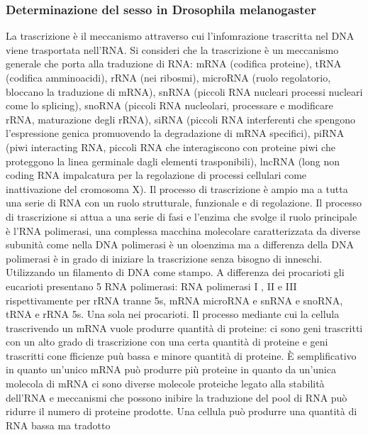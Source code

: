 		\subsubsection{Determinazione del sesso in Drosophila melanogaster}










La trascrizione \`e il meccanismo attraverso cui l'infomrazione trascritta nel DNA viene trasportata nell'RNA. Si consideri che la trascrizione \`e un meccanismo generale che porta
alla traduzione di RNA: mRNA (codifica proteine), tRNA (codifica amminoacidi), rRNA (nei ribosmi), microRNA (ruolo regolatorio, bloccano la traduzione di mRNA), snRNA (piccoli RNA 
nucleari processi nucleari come lo splicing), snoRNA (piccoli RNA nucleolari, processare e modificare rRNA, maturazione degli rRNA), siRNA (piccoli RNA interferenti che spengono 
l'espressione genica promuovendo la degradazione di mRNA specifici), piRNA (piwi interacting RNA, piccoli RNA che interagiscono con proteine piwi che proteggono la linea germinale dagli
elementi trasponibili), lncRNA (long non coding RNA impalcatura per la regolazione di processi cellulari come inattivazione del cromosoma X). Il processo di trascrizione \`e ampio ma a 
tutta una serie di RNA con un ruolo strutturale, funzionale e di regolazione. Il processo di trascrizione si attua a una serie di fasi e l'enzima che svolge il ruolo principale \`e l'RNA
polimerasi, una complessa macchina molecolare caratterizzata da diverse subunit\`a come nella DNA polimerasi \`e un oloenzima ma a differenza della DNA polimerasi \`e in grado di iniziare
la trascrizione senza bisogno di inneschi. Utilizzando un filamento di DNA come stampo. A differenza dei procarioti gli eucarioti presentano 5 RNA polimerasi: RNA polimerasi I , II e III
rispettivamente per rRNA tranne 5s, mRNA microRNA e snRNA e snoRNA, tRNA e rRNA 5s. Una sola nei procarioti. Il processo mediante cui la cellula trascrivendo un mRNA vuole produrre 
quantit\`a di proteine: ci sono geni trascritti con un alto grado di trascrizione con una certa quantit\`a di proteine e geni trascritti cone fficienze pu\`u bassa e minore quantit\`a 
di proteine. \`E semplificativo in quanto un'unico mRNA pu\`o produrre pi\`u proteine in quanto da un'unica molecola di mRNA ci sono diverse molecole proteiche legato alla stabilit\`a 
dell'RNA e meccanismi che possono inibire la traduzione del pool di RNA pu\`o ridurre il numero di proteine prodotte. Una cellula pu\`o produrre una quantit\`a di RNA bassa ma tradotto
